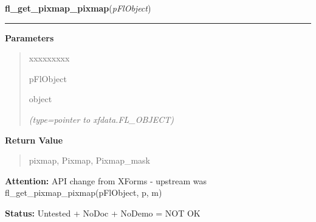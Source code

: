    \label{xformslib:flbitmap:fl_get_pixmap_pixmap}

    \vspace{0.5ex}

\hspace{.8\funcindent}\begin{boxedminipage}{\funcwidth}

    \raggedright \textbf{fl\_get\_pixmap\_pixmap}(\textit{pFlObject})

    \vspace{-1.5ex}

    \rule{\textwidth}{0.5\fboxrule}
\setlength{\parskip}{2ex}
\setlength{\parskip}{1ex}
      \textbf{Parameters}
      \vspace{-1ex}

      \begin{quote}
        \begin{Ventry}{xxxxxxxxx}

          \item[pFlObject]

          object

            {\it (type=pointer to xfdata.FL\_OBJECT)}

        \end{Ventry}

      \end{quote}

      \textbf{Return Value}
    \vspace{-1ex}

      \begin{quote}
      pixmap, Pixmap, Pixmap\_mask

      \end{quote}

\textbf{Attention:} API change from XForms - upstream was fl\_get\_pixmap\_pixmap(pFlObject, p,
m)



\textbf{Status:} Untested + NoDoc + NoDemo = NOT OK



    \end{boxedminipage}

    \label{xformslib:flbitmap:fl_get_pixmap_pixmap}

    \vspace{0.5ex}

